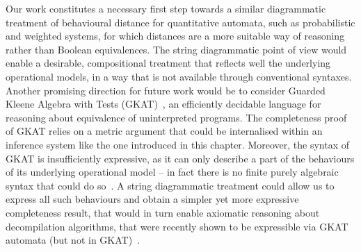 Our work constitutes a necessary first step towards a similar diagrammatic treatment of behavioural distance for quantitative automata, such as probabilistic and weighted systems, for which distances are a more suitable way of reasoning rather than Boolean equivalences. The string diagrammatic point of view would enable a desirable, compositional treatment that reflects well the underlying operational models, in a way that is not available through conventional syntaxes. Another promising direction for future work would be to consider Guarded Kleene Algebra with Tests (GKAT)~\cite{Smolka:2020:Guarded,Schmid:2021:Guarded}, an efficiently decidable language for reasoning about equivalence of uninterpreted programs. The completeness proof of GKAT relies on a metric argument that could be internalised within an inference system like the one introduced in this chapter. Moreover, the syntax of GKAT is insufficiently expressive, as it can only describe a part of the behaviours of its underlying operational model -- in fact there is no finite purely algebraic syntax that could do so~\cite{Cate:2025:Algebras}. A string diagrammatic treatment could allow us to express all such behaviours and obtain a simpler yet more expressive completeness result, that would in turn enable axiomatic reasoning about decompilation algorithms, that were recently shown to be expressible via GKAT automata (but not in GKAT)~\cite{Zhang:2025:CFGKAT}.


 
